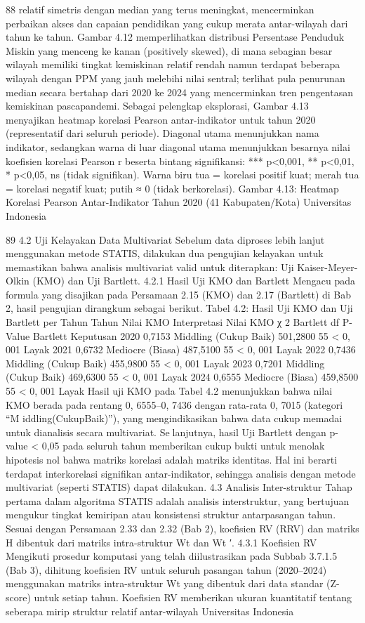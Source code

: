 88
relatif simetris dengan median yang terus meningkat, mencerminkan perbaikan akses dan
capaian pendidikan yang cukup merata antar-wilayah dari tahun ke tahun. Gambar 4.12
memperlihatkan distribusi Persentase Penduduk Miskin yang menceng ke kanan (positively
skewed), di mana sebagian besar wilayah memiliki tingkat kemiskinan relatif rendah
namun terdapat beberapa wilayah dengan PPM yang jauh melebihi nilai sentral; terlihat
pula penurunan median secara bertahap dari 2020 ke 2024 yang mencerminkan tren
pengentasan kemiskinan pascapandemi.
Sebagai pelengkap eksplorasi, Gambar 4.13 menyajikan heatmap korelasi Pearson
antar-indikator untuk tahun 2020 (representatif dari seluruh periode). Diagonal utama
menunjukkan nama indikator, sedangkan warna di luar diagonal utama menunjukkan
besarnya nilai koefisien korelasi Pearson r beserta bintang signifikansi: *** p<0,001,
** p<0,01, * p<0,05, ns (tidak signifikan). Warna biru tua = korelasi positif kuat; merah
tua = korelasi negatif kuat; putih ≈ 0 (tidak berkorelasi).
Gambar 4.13: Heatmap Korelasi Pearson Antar-Indikator Tahun 2020 (41
Kabupaten/Kota)
Universitas Indonesia

89
4.2 Uji Kelayakan Data Multivariat
Sebelum data diproses lebih lanjut menggunakan metode STATIS, dilakukan dua
pengujian kelayakan untuk memastikan bahwa analisis multivariat valid untuk diterapkan:
Uji Kaiser-Meyer-Olkin (KMO) dan Uji Bartlett.
4.2.1 Hasil Uji KMO dan Bartlett
Mengacu pada formula yang disajikan pada Persamaan 2.15 (KMO) dan 2.17 (Bartlett)
di Bab 2, hasil pengujian dirangkum sebagai berikut.
Tabel 4.2: Hasil Uji KMO dan Uji Bartlett per Tahun
Tahun Nilai KMO Interpretasi Nilai KMO χ
2 Bartlett df P-Value Bartlett Keputusan
2020 0,7153 Middling (Cukup Baik) 501,2800 55 < 0, 001 Layak
2021 0,6732 Mediocre (Biasa) 487,5100 55 < 0, 001 Layak
2022 0,7436 Middling (Cukup Baik) 455,9800 55 < 0, 001 Layak
2023 0,7201 Middling (Cukup Baik) 469,6300 55 < 0, 001 Layak
2024 0,6555 Mediocre (Biasa) 459,8500 55 < 0, 001 Layak
Hasil uji KMO pada Tabel 4.2 menunjukkan bahwa nilai KMO berada pada rentang
0, 6555–0, 7436 dengan rata-rata 0, 7015 (kategori “M iddling(CukupBaik)”), yang
mengindikasikan bahwa data cukup memadai untuk dianalisis secara multivariat. Selanjutnya, hasil Uji Bartlett dengan p-value < 0,05 pada seluruh tahun memberikan cukup
bukti untuk menolak hipotesis nol bahwa matriks korelasi adalah matriks identitas. Hal ini
berarti terdapat interkorelasi signifikan antar-indikator, sehingga analisis dengan metode
multivariat (seperti STATIS) dapat dilakukan.
4.3 Analisis Inter-struktur
Tahap pertama dalam algoritma STATIS adalah analisis interstruktur, yang bertujuan
mengukur tingkat kemiripan atau konsistensi struktur antarpasangan tahun. Sesuai dengan
Persamaan 2.33 dan 2.32 (Bab 2), koefisien RV (RRV) dan matriks H dibentuk dari matriks
intra-struktur Wt dan Wt
′.
4.3.1 Koefisien RV
Mengikuti prosedur komputasi yang telah diilustrasikan pada Subbab 3.7.1.5 (Bab 3),
dihitung koefisien RV untuk seluruh pasangan tahun (2020–2024) menggunakan matriks
intra-struktur Wt yang dibentuk dari data standar (Z-score) untuk setiap tahun. Koefisien
RV memberikan ukuran kuantitatif tentang seberapa mirip struktur relatif antar-wilayah
Universitas Indonesia

